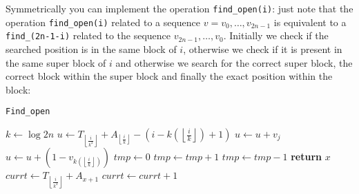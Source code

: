 \documentclass{article}
\begin{document}
Symmetrically you can implement the operation \texttt{find\_open(i)}: just note that the operation \texttt{find\_open(i)} related to a sequence $v=v_0,\dots,v_{2n-1}$ is equivalent to a \texttt{find\_(2n-1-i)} related to the sequence $v_{2n-1},\dots,v_0$. Initially we check if the searched position is in the same block of $i$, otherwise we check if it is present in the same super block of $i$ and otherwise we search for the correct super block, the correct block within the super block and finally the exact position within the block:
    \begin{algorithm}[H]
    \caption{\texttt{Find\_open}}\label{findopen}
    \begin{algorithmic}[1]
        \State $k\gets\log{2n}$
        \State $u\gets T_{\left\lfloor{\frac{i}{k^2}}\right\rfloor}+A_{\left\lfloor{\frac{i}{k}}\right\rfloor}-(i-k(\left\lfloor{\frac{i}{k}}\right\rfloor)+1)$
            \State $u\gets u+v_j$
        \EndFor
        \State $u\gets u+(1-v_{k(\left\lfloor{\frac{i}{k}}\right\rfloor)})$
        \State
        \State $tmp\gets 0$
                \State $tmp\gets tmp+1$
            \Else  
                \State $tmp\gets tmp-1$
            \EndIf
                \State \textbf{return} $x$
            \EndIf
        \EndFor
        \State
                \State $currt\gets T_{\left\lfloor{\frac{i}{k^2}}\right\rfloor}+A_{x+1}$
                        \State $currt\gets currt+1$
                    \EndIf
    \end{algorithmic}
    \end{algorithm}
\end{document}
